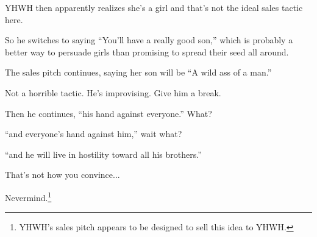 {
}
{
}
{
	YHWH then apparently realizes she's a girl and that's not the ideal sales tactic here.
	
	So he switches to saying ``You'll have a really good son,'' which is probably a
	better way to persuade girls than promising to spread their seed all around.
}

{
}
{
}
{
	The sales pitch continues, saying her son will be ``A wild ass of a man.''
	
	Not a horrible tactic. He's improvising. Give him a break.

	Then he continues, ``his hand against everyone.'' What?

	``and everyone’s hand against him,'' wait what?

	``and he will live in hostility toward all his brothers.''

	That's not how you convince...

	Nevermind.\footnote{YHWH's sales pitch appears to be designed to sell this idea to YHWH.}

}

